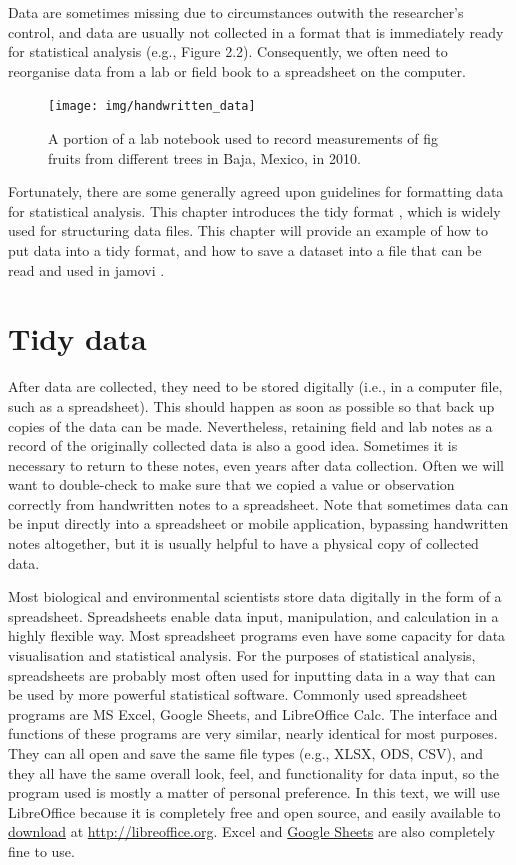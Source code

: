 \documentclass[
]{scrbook}
\begin{document}
Data are sometimes missing due to circumstances outwith the researcher's control, and data are usually not collected in a format that is immediately ready for statistical analysis (e.g., Figure 2.2).
Consequently, we often need to reorganise data from a lab or field book to a spreadsheet on the computer.

\begin{figure}
\texttt{[image: img/handwritten\_data]} \caption{A portion of a lab notebook used to record measurements of fig fruits from different trees in Baja, Mexico, in 2010.}\label{fig:unnamed-chunk-5}
\end{figure}

Fortunately, there are some generally agreed upon guidelines for formatting data for statistical analysis.
This chapter introduces the tidy format \citep{Wickham2014}, which is widely used for structuring data files.
This chapter will provide an example of how to put data into a tidy format, and how to save a dataset into a file that can be read and used in jamovi \citep{Jamovi2022}.

\hypertarget{tidy-data}{%
\section{Tidy data}\label{tidy-data}}

After data are collected, they need to be stored digitally (i.e., in a computer file, such as a spreadsheet).
This should happen as soon as possible so that back up copies of the data can be made.
Nevertheless, retaining field and lab notes as a record of the originally collected data is also a good idea.
Sometimes it is necessary to return to these notes, even years after data collection.
Often we will want to double-check to make sure that we copied a value or observation correctly from handwritten notes to a spreadsheet.
Note that sometimes data can be input directly into a spreadsheet or mobile application, bypassing handwritten notes altogether, but it is usually helpful to have a physical copy of collected data.

Most biological and environmental scientists store data digitally in the form of a spreadsheet.
Spreadsheets enable data input, manipulation, and calculation in a highly flexible way.
Most spreadsheet programs even have some capacity for data visualisation and statistical analysis.
For the purposes of statistical analysis, spreadsheets are probably most often used for inputting data in a way that can be used by more powerful statistical software.
Commonly used spreadsheet programs are MS Excel, Google Sheets, and LibreOffice Calc.
The interface and functions of these programs are very similar, nearly identical for most purposes.
They can all open and save the same file types (e.g., XLSX, ODS, CSV), and they all have the same overall look, feel, and functionality for data input, so the program used is mostly a matter of personal preference.
In this text, we will use LibreOffice because it is completely free and open source, and easily available to \href{https://www.libreoffice.org/download/download-libreoffice/}{download} at \url{http://libreoffice.org}.
Excel and \href{https://docs.google.com/spreadsheets}{Google Sheets} are also completely fine to use.
\end{document}
